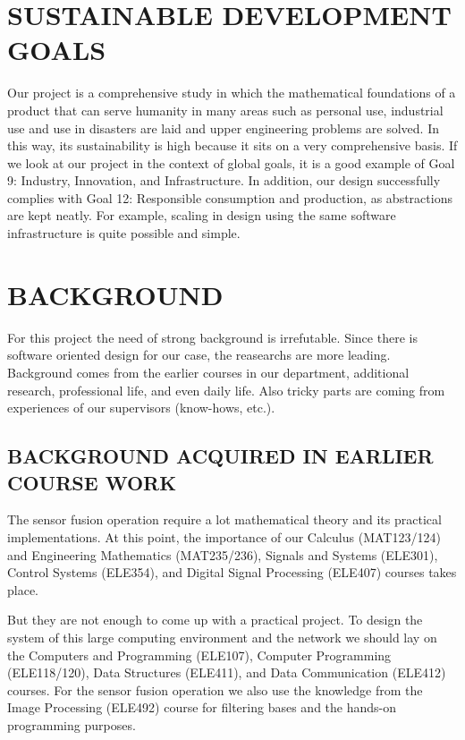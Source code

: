 \documentclass[12pt]{article}
\begin{document}
\section{SUSTAINABLE DEVELOPMENT GOALS}

Our project is a comprehensive study in which the mathematical foundations of a product that can serve humanity in many areas such as personal use, industrial use and use in disasters are laid and upper engineering problems are solved. In this way, its sustainability is high because it sits on a very comprehensive basis. If we look at our project in the context of global goals, it is a good example of Goal 9: Industry, Innovation, and Infrastructure. In addition, our design successfully complies with Goal 12: Responsible consumption and production, as abstractions are kept neatly. For example, scaling in design using the same software infrastructure is quite possible and simple.


\section{BACKGROUND}

For this project the need of strong background is irrefutable. Since there is software oriented design for our case, the reasearchs are more leading. Background comes from the earlier courses in our department, additional research, professional life, and even daily life. Also tricky parts are coming from experiences of our supervisors (know-hows, etc.).

\subsection{BACKGROUND ACQUIRED IN EARLIER COURSE WORK}

The sensor fusion operation require a lot mathematical theory and its practical implementations. At this point, the importance of our Calculus (MAT123/124) and Engineering Mathematics (MAT235/236), Signals and Systems (ELE301), Control Systems (ELE354), and Digital Signal Processing (ELE407) courses takes place. 

But they are not enough to come up with a practical project. To design the system of this large computing environment and the network we should lay on the Computers and Programming (ELE107), Computer Programming (ELE118/120), Data Structures (ELE411), and Data Communication (ELE412) courses. For the sensor fusion operation we also use the knowledge from the Image Processing (ELE492) course for filtering bases and the hands-on programming purposes.
\end{document}
